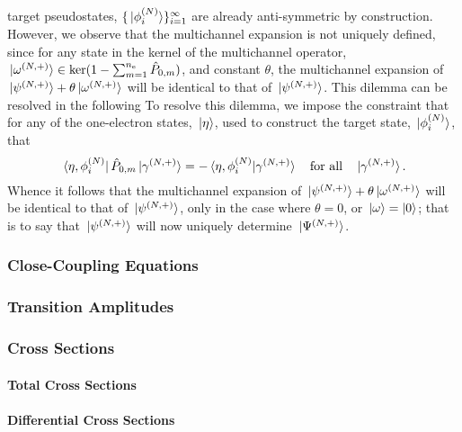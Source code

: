 \documentclass[draft]{article}
\begin{document}
target pseudostates, $\lbrace\ket*{\phi_{i}^{(N)}}\rbrace_{i = 1}^{\infty}$ are
already anti-symmetric by construction.
However, we observe that the multichannel expansion is not uniquely defined,
since for any state in the kernel of the multichannel operator,
$\ket*{\omega^{(N, +)}} \in
\ker(1 - \sum_{m = 1}^{n_{\mathrm{e}}}\hat{P}_{0, m})$,
and constant $\theta$, the multichannel expansion of
$\ket*{\psi^{(N, +)}} + \theta\ket*{\omega^{(N, +)}}$ will be identical to
that of $\ket*{\psi^{(N, +)}}$.
This dilemma can be resolved in the following
To resolve this dilemma, we impose the constraint that for any of the
one-electron states, $\ket*{\eta}$, used to construct the target state,
$\ket*{\phi_{i}^{(N)}}$, that
\begin{equation}
  \label{eq:multichannel-constraint}
  \bra*{\eta, \phi_{i}^{\lr{N}}}
  \hat{P}_{0, m}
  \ket*{\gamma^{\lr{N, +}}}
  =
  -
  \bra*{\eta, \phi_{i}^{\lr{N}}}
  \ket*{\gamma^{\lr{N, +}}}
  \qq{for all}
  \ket*{\gamma^{\lr{N, +}}}
  .
\end{equation}
Whence it follows that the multichannel expansion of
$\ket*{\psi^{(N, +)}} + \theta\ket*{\omega^{(N, +)}}$ will be identical to
that of $\ket*{\psi^{(N, +)}}$, only in the case where $\theta = 0$, or
$\ket*{\omega} = \ket{0}$; that is to say that $\ket*{\psi^{(N, +)}}$ will
now uniquely determine $\ket*{\Psi^{(N, +)}}$.

\subsubsection{Close-Coupling Equations}
\label{sec:cc-equations}

\subsubsection{Transition Amplitudes}
\label{sec:transition-amplitudes}

\subsubsection{Cross Sections}
\label{sec:cross-sections}

\paragraph{Total Cross Sections}

\paragraph{Differential Cross Sections}
\end{document}
